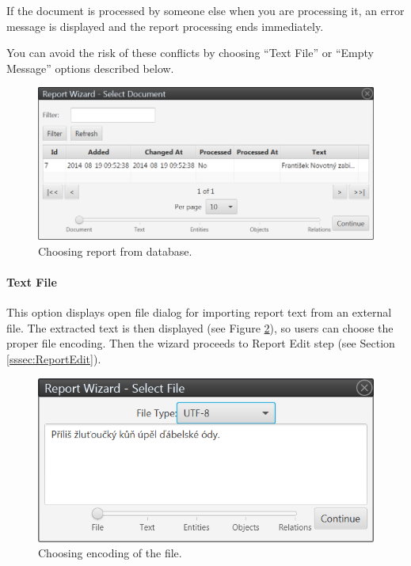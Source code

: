 If the document is processed by someone else when you are processing it, an
error message is displayed and the report processing ends immediately.

You can avoid the risk of these conflicts by choosing ``Text File'' or ``Empty
Message'' options described below.

\begin{figure}[!htb]
        \centering
        \includegraphics[width=\textwidth]{Images/database}
        \caption{Choosing report from database.}
        \label{fig:Database}
\end{figure}

\paragraph{Text File} This option displays open file dialog for importing
report text from an external file. The extracted text is then displayed (see
Figure \ref{fig:TextFile}), so users can choose the proper file encoding. Then
the wizard proceeds to Report Edit step (see Section \ref{sssec:ReportEdit}).

\begin{figure}[!htb]
        \centering
        \includegraphics[width=\textwidth]{Images/textfile}
        \caption{Choosing encoding of the file.}
        \label{fig:TextFile}
\end{figure}

